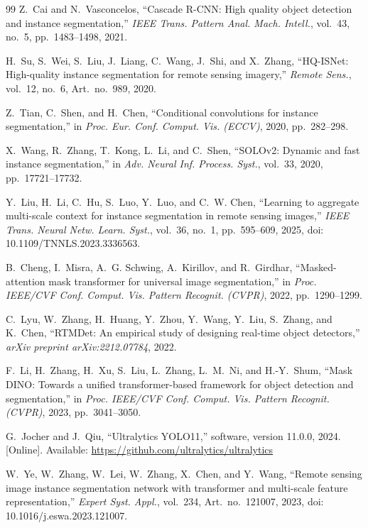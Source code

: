 \documentclass[letterpaper,journal]{IEEEtran}
\begin{document}
\begin{thebibliography}{99}
Z.~Cai and N.~Vasconcelos, ``Cascade R-CNN: High quality object detection and instance segmentation,'' \textit{IEEE Trans. Pattern Anal. Mach. Intell.}, vol.~43, no.~5, pp.~1483--1498, 2021.

H.~Su, S.~Wei, S.~Liu, J.~Liang, C.~Wang, J.~Shi, and X.~Zhang, ``HQ-ISNet: High-quality instance segmentation for remote sensing imagery,'' \textit{Remote Sens.}, vol.~12, no.~6, Art.~no.~989, 2020.

Z.~Tian, C.~Shen, and H.~Chen, ``Conditional convolutions for instance segmentation,'' in \textit{Proc. Eur. Conf. Comput. Vis. (ECCV)}, 2020, pp.~282--298.

X.~Wang, R.~Zhang, T.~Kong, L.~Li, and C.~Shen, ``SOLOv2: Dynamic and fast instance segmentation,'' in \textit{Adv. Neural Inf. Process. Syst.}, vol.~33, 2020, pp.~17721--17732.

Y.~Liu, H.~Li, C.~Hu, S.~Luo, Y.~Luo, and C.~W. Chen, ``Learning to aggregate multi-scale context for instance segmentation in remote sensing images,'' \textit{IEEE Trans. Neural Netw. Learn. Syst.}, vol.~36, no.~1, pp.~595--609, 2025, doi: 10.1109/TNNLS.2023.3336563.

B.~Cheng, I.~Misra, A.~G. Schwing, A.~Kirillov, and R.~Girdhar, ``Masked-attention mask transformer for universal image segmentation,'' in \textit{Proc. IEEE/CVF Conf. Comput. Vis. Pattern Recognit. (CVPR)}, 2022, pp.~1290--1299.

C.~Lyu, W.~Zhang, H.~Huang, Y.~Zhou, Y.~Wang, Y.~Liu, S.~Zhang, and K.~Chen, ``RTMDet: An empirical study of designing real-time object detectors,'' \textit{arXiv preprint arXiv:2212.07784}, 2022.

F.~Li, H.~Zhang, H.~Xu, S.~Liu, L.~Zhang, L.~M.~Ni, and H.-Y.~Shum, ``Mask DINO: Towards a unified transformer-based framework for object detection and segmentation,'' in \textit{Proc. IEEE/CVF Conf. Comput. Vis. Pattern Recognit. (CVPR)}, 2023, pp.~3041--3050.

G.~Jocher and J.~Qiu, ``Ultralytics YOLO11,'' software, version 11.0.0, 2024. [Online]. Available: \url{https://github.com/ultralytics/ultralytics}

W.~Ye, W.~Zhang, W.~Lei, W.~Zhang, X.~Chen, and Y.~Wang, ``Remote sensing image instance segmentation network with transformer and multi-scale feature representation,'' \textit{Expert Syst. Appl.}, vol.~234, Art.~no.~121007, 2023, doi: 10.1016/j.eswa.2023.121007.


\end{thebibliography}
\end{document}
